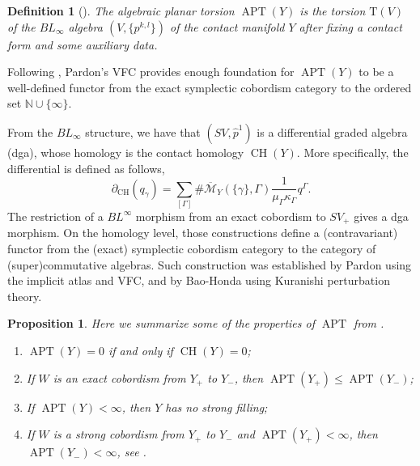\documentclass[11pt]{amsart}
\numberwithin{equation}{section}
\newtheorem{definition}[theorem]{\textbf{Definition}}
\newtheorem{proposition}[theorem]{\textbf{Proposition}}
\def\N{{\mathbb N}}
\def\cM{{\mathcal M}}
\DeclareMathOperator{\APT}{APT}
\DeclareMathOperator{\CH}{CH}
\begin{document}
\begin{definition}[{\cite[Definition 3.12, Proposition 3.13]{moreno2024landscape}}]
    The algebraic planar torsion $\APT(Y)$ is the torsion $\mathrm{T}(V)$ of the $BL_\infty$ algebra $(V,\{p^{k,l}\})$ of the contact manifold $Y$ after fixing a contact form and some auxiliary data.
\end{definition}
Following \cite[\S 3.6]{moreno2024landscape}, Pardon's VFC provides enough foundation for $\APT(Y)$ to be a well-defined functor from the exact symplectic cobordism category to the ordered set $\N\cup \{\infty\}$.

From the $BL_\infty$ structure, we have that $(SV,\widehat{p}^1)$ is a differential graded algebra (dga), whose homology is the contact homology $\CH(Y)$. More specifically, the differential is defined as follows,
\begin{equation}\label{eqn:partial}
\partial_{\CH}(q_{\gamma}) = \sum_{[\Gamma]} \#\overline{\cM}_{Y}(\{\gamma \},\Gamma) \frac{1}{\mu_{\Gamma}\kappa_{\Gamma}}q^{\Gamma}.
\end{equation}
The restriction of a $BL^{\infty}$ morphism from an exact cobordism to $SV_+$ gives a dga morphism. On the homology level, those constructions define a (contravariant) functor from the (exact) symplectic cobordism category to the category of (super)commutative algebras. Such construction was established by Pardon \cite{zbMATH07085531} using the implicit atlas and VFC, and by Bao-Honda \cite{zbMATH07656377} using Kuranishi perturbation theory. 

\begin{proposition}\label{prop:APT}
    Here we summarize some of the properties of $\APT$ from \cite{moreno2024landscape,moreno2024rsft}.
    \begin{enumerate}
        \item $\APT(Y)=0$ if and only if $\CH(Y)=0$;
        \item If $W$ is an exact cobordism from $Y_+$ to $Y_-$, then $\APT(Y_+)\le \APT(Y_-)$;
        \item If $\APT(Y)<\infty$, then $Y$ has no strong filling;
        \item\label{APT4} If $W$ is a strong cobordism from $Y_+$ to $Y_-$ and $\APT(Y_+)<\infty$, then $\APT(Y_-)<\infty$, see \cite[Theorem 1.1]{moreno2024rsft}.
    \end{enumerate}
\end{proposition}
\end{document}
